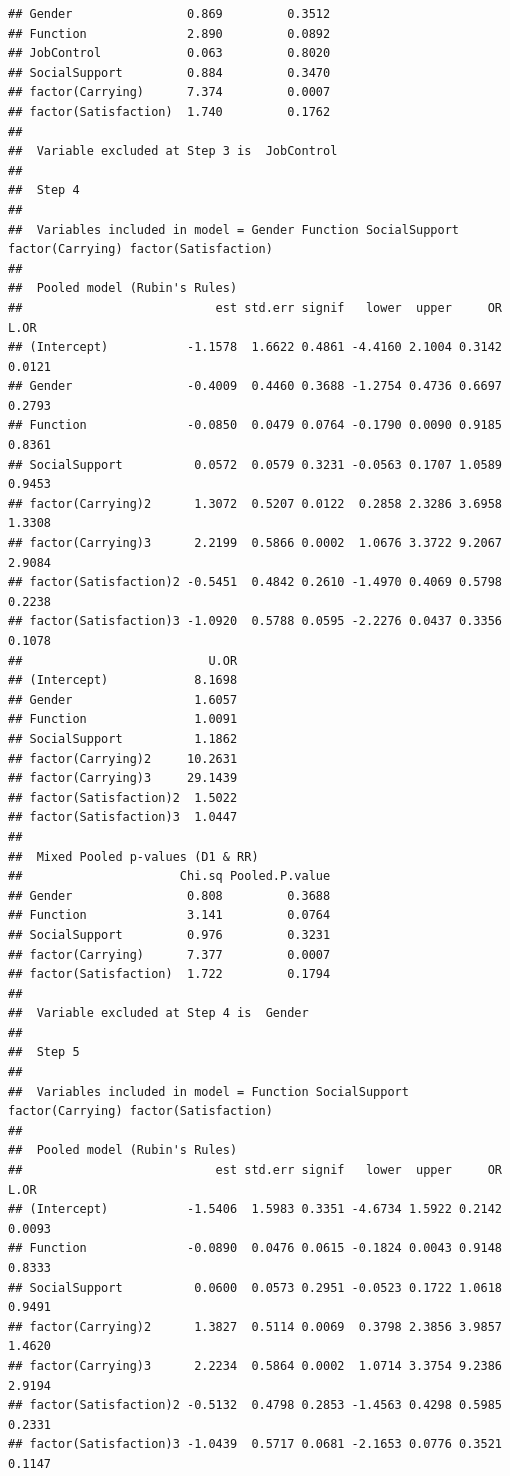 \documentclass[]{book}
\begin{document}
\begin{verbatim}
## Gender                0.869         0.3512
## Function              2.890         0.0892
## JobControl            0.063         0.8020
## SocialSupport         0.884         0.3470
## factor(Carrying)      7.374         0.0007
## factor(Satisfaction)  1.740         0.1762
## 
##  Variable excluded at Step 3 is  JobControl 
## 
##  Step 4 
## 
##  Variables included in model = Gender Function SocialSupport factor(Carrying) factor(Satisfaction) 
## 
##  Pooled model (Rubin's Rules) 
##                           est std.err signif   lower  upper     OR   L.OR
## (Intercept)           -1.1578  1.6622 0.4861 -4.4160 2.1004 0.3142 0.0121
## Gender                -0.4009  0.4460 0.3688 -1.2754 0.4736 0.6697 0.2793
## Function              -0.0850  0.0479 0.0764 -0.1790 0.0090 0.9185 0.8361
## SocialSupport          0.0572  0.0579 0.3231 -0.0563 0.1707 1.0589 0.9453
## factor(Carrying)2      1.3072  0.5207 0.0122  0.2858 2.3286 3.6958 1.3308
## factor(Carrying)3      2.2199  0.5866 0.0002  1.0676 3.3722 9.2067 2.9084
## factor(Satisfaction)2 -0.5451  0.4842 0.2610 -1.4970 0.4069 0.5798 0.2238
## factor(Satisfaction)3 -1.0920  0.5788 0.0595 -2.2276 0.0437 0.3356 0.1078
##                          U.OR
## (Intercept)            8.1698
## Gender                 1.6057
## Function               1.0091
## SocialSupport          1.1862
## factor(Carrying)2     10.2631
## factor(Carrying)3     29.1439
## factor(Satisfaction)2  1.5022
## factor(Satisfaction)3  1.0447
## 
##  Mixed Pooled p-values (D1 & RR) 
##                      Chi.sq Pooled.P.value
## Gender                0.808         0.3688
## Function              3.141         0.0764
## SocialSupport         0.976         0.3231
## factor(Carrying)      7.377         0.0007
## factor(Satisfaction)  1.722         0.1794
## 
##  Variable excluded at Step 4 is  Gender 
## 
##  Step 5 
## 
##  Variables included in model = Function SocialSupport factor(Carrying) factor(Satisfaction) 
## 
##  Pooled model (Rubin's Rules) 
##                           est std.err signif   lower  upper     OR   L.OR
## (Intercept)           -1.5406  1.5983 0.3351 -4.6734 1.5922 0.2142 0.0093
## Function              -0.0890  0.0476 0.0615 -0.1824 0.0043 0.9148 0.8333
## SocialSupport          0.0600  0.0573 0.2951 -0.0523 0.1722 1.0618 0.9491
## factor(Carrying)2      1.3827  0.5114 0.0069  0.3798 2.3856 3.9857 1.4620
## factor(Carrying)3      2.2234  0.5864 0.0002  1.0714 3.3754 9.2386 2.9194
## factor(Satisfaction)2 -0.5132  0.4798 0.2853 -1.4563 0.4298 0.5985 0.2331
## factor(Satisfaction)3 -1.0439  0.5717 0.0681 -2.1653 0.0776 0.3521 0.1147

\end{verbatim}
\end{document}
